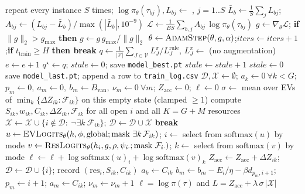 \documentclass[10pt]{article}
\newcommand{\Fe}{\mathcal F}
\begin{document}
\begin{algorithm}[H]
\begin{algorithmic}[1]
    \Else {}
      \State repeat every instance $S$ times; $\log\pi_\theta(\tau_{bj}), L_{bj} \gets$ , $j=1..S$
      \State $\bar L_b \gets \frac1S\sum_{j} L_{bj}$;\quad $A_{bj}\gets (L_{bj}-\bar L_b)/\max(|\bar L_b|,10^{-9})$ 
      \State $\mathcal L \gets \frac{1}{BS}\sum_{b,j} A_{bj}\,\log\pi_\theta(\tau_{bj})$
    \EndIf
    \State $g\gets\nabla_\theta\mathcal L$;\; \textbf{if} $\|g\|_2>g_{\max}$ \textbf{then} $g\gets g\,g_{\max}/\|g\|_2$
    \State $\theta\gets\textsc{AdamStep}(\theta,g,\alpha)$;\quad $\textit{iters}\gets\textit{iters}+1$;\quad \textbf{if} $t_{\text{train}}\ge H$ \textbf{then break}
  \EndFor
  \State $q\gets \frac{1}{|\mathcal V|}\sum_{J\in\mathcal V} L_J^{\pi}/L^{\text{rule}}_J$, \;$L_J^{\pi}\gets$  (no augmentation)
  \State $e\gets e+1$
   
    \State $q^{\star}\gets q$;\; $\textit{stale}\gets0$;\; save \texttt{model\_best.pt}
   \State $\textit{stale}\gets\textit{stale}+1$
  \Else \State $\textit{stale}\gets 0$
  \EndIf
  \State save \texttt{model\_last.pt}; append a row to \texttt{train\_log.csv}
\EndWhile
\Statex
{} 
  \State $\mathcal D,\mathcal X\gets\emptyset$;\; $a_k\gets0\ \forall k<G$;\; $p_m\gets0,\ a_m\gets0,\ b_m\gets B_{\text{van}},\ \nu_m\gets0\ \forall m$;\; $Z_{\text{acc}}\gets0$;\; $\ell\gets0$
  \State $\sigma\gets$ mean over EVs of $\min_k\{\Delta Z_{ik}:\Fe_{ik}\}$ on this empty state (clamped $\ge1$) 
  \Loop
    \State compute $S_{ik},w_{ik},C_{ik},\Delta Z_{ik},\Fe_{ik}$ for all open $i$ and all $K=G{+}M$ resources 
    \State $\mathcal X\gets\mathcal X\cup\{i\notin\mathcal D:\ \neg\exists k\ \Fe_{ik}\}$;\; $\mathcal D\gets\mathcal D\cup\mathcal X$ 
     
      \State \textbf{break}
    \EndIf
    \State $u\gets \textsc{EVLogits}_\theta(h,\phi,\text{global}; \text{mask } \exists k\,\Fe_{ik})$;\; $i\gets$ select from $\mathrm{softmax}(u)$ by mode
    \State $v\gets \textsc{ResLogits}_\theta(h_i,g,\rho,\psi_{i\cdot}; \text{mask }\Fe_{i\cdot})$;\; $k\gets$ select from $\mathrm{softmax}(v)$ by mode
    \State $\ell\gets\ell+\log\mathrm{softmax}(u)_i+\log\mathrm{softmax}(v)_k$
    \State $Z_{\text{acc}}\gets Z_{\text{acc}}+\Delta Z_{ik}$;\; $\mathcal D\gets\mathcal D\cup\{i\}$;\; record $(\mathrm{res}_i,S_{ik},C_{ik})$ 
     
      \State $a_k\gets C_{ik}$
    \Else {}
      \State $b_m\gets b_m-E_i/\eta-\beta d_{p_m,i+1}$;\; $p_m\gets i+1$;\; $a_m\gets C_{ik}$;\; $\nu_m\gets\nu_m+1$
    \EndIf
  \EndLoop
  \State \Return $\ell=\log\pi(\tau)$ and $L = Z_{\text{acc}}+\lambda\,\sigma\,|\mathcal X|$ 
\EndFunction
\end{algorithmic}
\end{algorithm}
\end{document}
